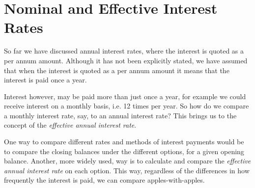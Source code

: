 
\section{Nominal and Effective Interest Rates}
\label{m:f11:nominal}

So far we have discussed annual interest rates, where the interest is quoted as a per annum amount. Although it has not been explicitly stated, we have assumed that when the interest is quoted as a per annum amount it means that the interest is paid once a year.

Interest however, may be paid more than just once a year, for example we could receive interest on a monthly basis, i.e. 12 times per year. So how do we compare a monthly interest rate, say, to an annual interest rate? This brings us to the concept of the \textit{effective annual interest rate}.

One way to compare different rates and methods of interest payments would be to compare the closing balances under the different options, for a given opening balance. Another, more widely used, way is to calculate and compare the \textit{effective annual interest rate} on each option. This way, regardless of the differences in how frequently the interest is paid, we can compare apples-with-apples.

